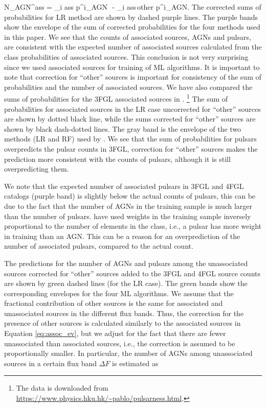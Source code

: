\be
{}
N_{\rm AGN}^{\rm ass}  = \sum_{i \in \rm ass} p^i_{\rm AGN}\,\, - \sum_{i \in \rm ass\,other} p^i_{\rm AGN}.
\ee
The corrected sums of probabilities for LR method are shown by dashed purple lines.
The purple bands show the envelope of the sum of corrected probabilities for the four methods used in this paper.
We see that the counts of associated sources, AGNs and pulsars, are consistent with the expected number of associated sources
calculated from the class probabilities of associated sources.
This conclusion is not very surprising since we used associated sources for training of ML algorithms.
It is important to note that correction for ``other'' sources is important for consistency of the sum of probabilities and the number of associated sources.
We have also compared the sums of probabilities for the 3FGL associated sources in \cite{2016ApJ...820....8S}.%
\footnote{The data is downloaded from \url{https://www.physics.hku.hk/~pablo/pulsarness.html}.}
The sum of probabilities for associated sources in the LR case uncorrected for ``other'' sources are shown by dotted black line,
while the sums corrected for ``other'' sources are shown by black dash-dotted lines.
The gray band is the envelope of the two methods (LR and RF) used by \cite{2016ApJ...820....8S}.
We see that the sum of probabilities for pulsars overpredicts the pulsar counts in 3FGL, correction for ``other'' sources makes the prediction 
more consistent with the counts of pulsars, although it is still overpredicting them.

We note that the expected number of associated pulsars in 3FGL and 4FGL catalogs (purple band) is slightly below the 
actual counts of pulsars, this can be due to the fact that the number of AGNs in the training sample is much larger than the number of pulsars.
\cite{2016ApJ...820....8S} have used weights in the training sample inversely proportional to the number of elements in the class,
i.e., a pulsar has more weight in training than an AGN.
This can be a reason for an overprediction of the number of associated pulsars, compared to the actual count.


The predictions for the number of AGNs and pulsars among the unassociated sources corrected for ``other'' sources 
added to the 3FGL and 4FGL source counts are shown by green dashed lines (for the LR case).
The green bands show the corresponding envelopes for the four ML algorithms.
We assume that the fractional contribution of other sources is the same for associated and unassociated sources in the different flux bands.
Thus, the correction for the presence of other sources is calculated similarly to the associated sources in Equation \ref{eq:assoc_ev},
but we adjust for the fact that there are fewer unassociated than associated sources, i.e., 
the correction is assumed to be proportionally smaller.
In particular, the number of AGNs among unassociated sources in a certain flux band $\Delta F$ is estimated as

